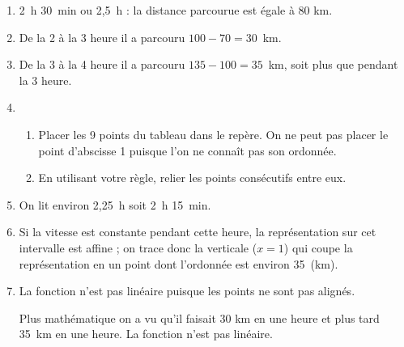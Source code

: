 \begin{enumerate}
\item %
2~h 30~min ou 2,5~h : la distance parcourue est égale à 80 km.
\item %
De la 2 à la 3 heure il a parcouru $100 - 70 = 30$~km.
\item %
De la 3 à la 4 heure il a parcouru $135 - 100 = 35$~km, soit plus que pendant la 3 heure.
\item %
	\begin{enumerate}
		\item Placer les 9 points du tableau dans le repère. On ne peut pas placer le
point d'abscisse 1 puisque l'on ne connaît pas son ordonnée.
		\item En utilisant votre règle, relier les points consécutifs entre eux.
 	\end{enumerate}
\item %
On lit environ 2,25~h soit 2~h 15~min.
\item %
Si la vitesse est constante pendant cette heure, la représentation sur cet intervalle est affine ; on trace donc la verticale ($x = 1$) qui coupe la représentation en un point dont l'ordonnée est environ 35~(km).
\item %
La fonction n'est pas linéaire puisque les points ne sont pas alignés.

Plus mathématique on a vu qu'il faisait 30 km en une heure et plus tard 35~km en une heure. La fonction n'est pas linéaire.
\end{enumerate}

